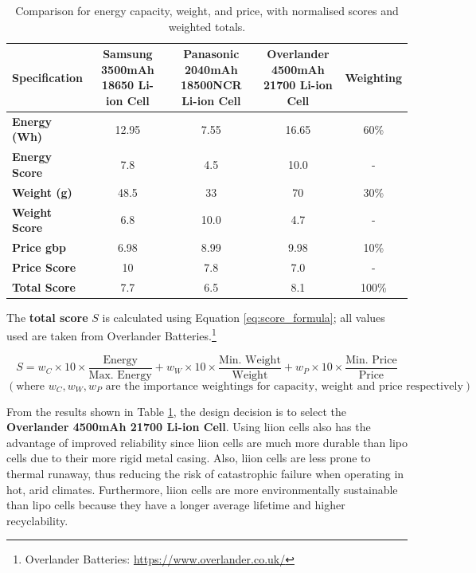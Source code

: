\begin{table}[h!]
\centering
\begin{tabular}{|l|c|c|c|c|}
\hline
\textbf{Specification} & 
\makecell{\textbf{Samsung}\\\textbf{3500mAh}\\\textbf{18650 Li-ion Cell}} &
\makecell{\textbf{Panasonic}\\\textbf{2040mAh}\\\textbf{18500NCR Li-ion Cell}} & 
\makecell{\textbf{Overlander}\\\textbf{4500mAh}\\\textbf{21700 Li-ion Cell}} & 
\textbf{Weighting} \\
\hline
\textbf{Energy (Wh)} & 12.95 & 7.55 & 16.65 & 60\%\\
\textbf{Energy Score} & 7.8& 4.5& 10.0& - \\\hline
\textbf{Weight (g)} & 48.5 & 33 & 70 & 30\% \\
\textbf{Weight Score} & 6.8& 10.0& 4.7& - \\
\hline
\textbf{Price \acrshort{gbp}} & 6.98 & 8.99 & 9.98& 10\%\\
\textbf{Price Score} & 10& 7.8& 7.0& - \\
\hline
\textbf{Total Score} & 7.7& 6.5& 8.1& 100\% \\
\hline
\end{tabular}
\caption{Comparison for energy capacity, weight, and price, with normalised scores and weighted totals.}
\label{tab:battery_comparison}
\end{table}

The \textbf{total score} \( S \) is calculated using Equation \ref{eq:score_formula}; all values used are taken from Overlander Batteries.\footnote{Overlander Batteries: \url{https://www.overlander.co.uk/}}

\begin{equation} \label{eq:score_formula}
S = w_C \times 10 \times\frac{\text{Energy}}{\text{Max. Energy}} + w_W \times 10 \times\frac{\text{Min. Weight}}{\text{Weight}} + w_P \times 10 \times\frac{\text{Min. Price}}{\text{Price}}
\end{equation}
\[(
\text{where }w_C, w_W, w_P \text{ are the importance weightings for capacity, weight and price respectively})
\]

From the results shown in Table \ref{tab:battery_comparison}, the design decision is to select the \textbf{Overlander 4500mAh 21700 Li-ion Cell}. Using \acrshort{liion} cells also has the advantage of improved reliability since \acrshort{liion} cells are much more durable than \acrshort{lipo} cells due to their more rigid metal casing. Also, \acrshort{liion} cells are less prone to thermal runaway, thus reducing the risk of catastrophic failure when operating in hot, arid climates. Furthermore, \acrshort{liion} cells are more environmentally sustainable than \acrshort{lipo} cells because they have a longer average lifetime and higher recyclability.

